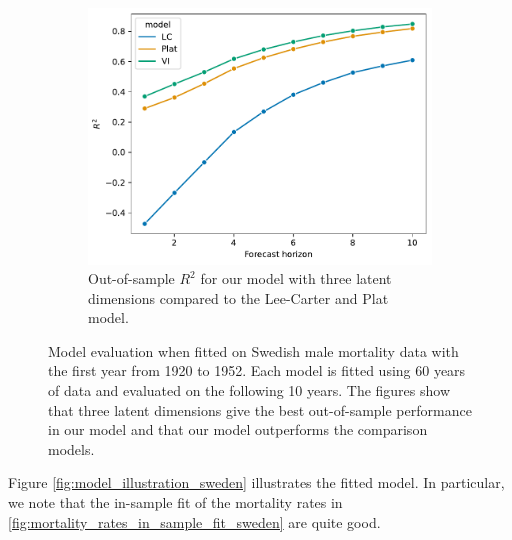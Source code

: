\documentclass[preprint,12pt]{elsarticle}
\begin{document}
\begin{figure}
\begin{subfigure}[b]{0.3\textwidth}
        \label{fig:model_evaluation_sweden_R2}
    \end{subfigure}
    \hfill
    \begin{subfigure}[b]{0.3\textwidth}
        \centering
        \includegraphics[width=\textwidth]{figs/model_comparison.pdf}
        \caption{Out-of-sample $R^2$ for our model with three latent dimensions compared to the Lee-Carter and Plat model.}
        \label{fig:model_comparison_sweden}
    \end{subfigure}
       \caption{Model evaluation when fitted on Swedish male mortality data with the first year from 1920 to 1952. Each model is fitted using 60 years of data and evaluated on the following 10 years. The figures show that three latent dimensions give the best out-of-sample performance in our model and that our model outperforms the comparison models.}
       \label{fig:model_evaluation_sweden}
\end{figure}
Figure \ref{fig:model_illustration_sweden} illustrates the fitted model. In particular, we note that the in-sample fit of the mortality rates in \ref{fig:mortality_rates_in_sample_fit_sweden} are quite good.
\end{document}
